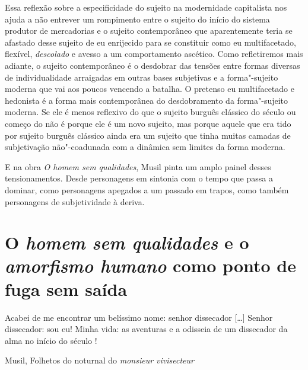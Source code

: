 Essa reflexão sobre a especificidade do sujeito na modernidade
capitalista nos ajuda a não entrever um rompimento entre o sujeito do
início do sistema produtor de mercadorias e o sujeito contemporâneo que
aparentemente teria se afastado desse sujeito de eu enrijecido para se
constituir como eu multifacetado, flexível, \emph{descolado} e avesso a
um comportamento ascético. Como refletiremos mais adiante, o sujeito
contemporâneo é o desdobrar das tensões entre formas diversas de
individualidade arraigadas em outras bases subjetivas e a forma"-sujeito
moderna que vai aos poucos vencendo a batalha. O pretenso eu
multifacetado e hedonista é a forma mais contemporânea do desdobramento
da forma"-sujeito moderna. Se ele é menos reflexivo do que o sujeito
burguês clássico do século  ou começo do  não é porque ele é um
novo sujeito, mas porque aquele que era tido por sujeito burguês
clássico ainda era um sujeito que tinha muitas camadas de subjetivação
não"-coadunada com a dinâmica sem limites da forma moderna.

E na obra \emph{O homem sem qualidades}, Musil pinta um amplo painel
desses tensionamentos. Desde personagens em sintonia com o tempo que
passa a dominar, como personagens apegados a um passado em trapos, como
também personagens de subjetividade à deriva.

\section{O \emph{homem sem qualidades} e o \emph{amorfismo humano} como ponto de fuga sem saída}



\epigraph{Acabei de me encontrar um belíssimo nome: senhor
dissecador [\ldots{}] Senhor dissecador: sou eu! Minha vida:
as aventuras e a odisseia de um dissecador da alma
no início do século !}{Musil, Folhetos do noturnal do \emph{monsieur vivisecteur}}


